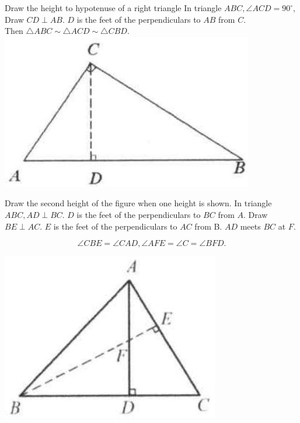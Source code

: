 \documentclass[10pt]{article}
\begin{document}
Draw the height to hypotenuse of a right triangle
In triangle \(A B C, \angle A C D=90^{\circ}\), Draw \(C D \perp A B\). \(D\) is the feet of the perpendiculars to \(A B\) from \(C\).\\
Then \(\triangle A B C \sim \triangle A C D \sim \triangle C B D\).\\
\includegraphics[max width=\textwidth, center]{2025_04_17_97bc1f7e44d93c271a88g-074(1)}

Draw the second height of the figure when one height is shown.
In triangle \(A B C, A D \perp B C\). \(D\) is the feet of the perpendiculars to \(B C\) from \(A\). Draw \(B E \perp A C\). \(E\) is the feet of the perpendiculars to \(A C\) from B. \(A D\) meets \(B C\) at \(F\).

\[
\angle C B E=\angle C A D, \angle A F E=\angle C=\angle B F D .
\]

\begin{center}
\includegraphics[max width=\textwidth]{2025_04_17_97bc1f7e44d93c271a88g-074(3)}
\end{center}
\end{document}
